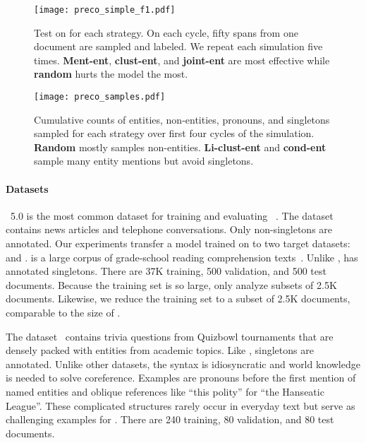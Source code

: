 \begin{figure}[!t]
    \centering
    \texttt{[image: preco\_simple\_f1.pdf]}
    \caption{Test \avgfone{} on \preco{} for each strategy.
    On each
    cycle,
    fifty spans from one document are sampled and labeled.
    We repeat each
    simulation five times.
    \textbf{Ment-ent},
    \textbf{clust-ent}, and \textbf{joint-ent} are most  effective
    while
    \textbf{random} hurts the model the most.
    }
    \label{fig:preco_simple}
\end{figure}

\begin{figure}[!t]
    \centering
    \texttt{[image: preco\_samples.pdf]}
    \caption{Cumulative counts of entities, non-entities, pronouns, and
    singletons
    sampled for each strategy over first four cycles of the \preco{} simulation. \textbf{Random} mostly samples
    non-entities. \textbf{Li-clust-ent} and \textbf{cond-ent} sample many
    entity mentions but avoid singletons.
    }
    \label{fig:preco_samples}
\end{figure}

\paragraph{Datasets}

\ontonotes~{\small 5.0} is the most common dataset for training and evaluating
\coref{}~\citep{pradhan-2013}.
The dataset contains news articles
and telephone conversations. Only non-singletons are annotated.
Our experiments transfer a model trained on \ontonotes{} to two
target datasets: \preco{} and \qbcoref{}.
\preco{} is a large corpus of grade-school reading comprehension
texts~\citep{chen-2018-preco}.
Unlike \ontonotes{}, \preco{} has annotated singletons. There are 37K training, 500 validation, and 500 test
documents.
Because the training set is so large, \citet{chen-2018-preco} only analyze
subsets of 2.5K documents.
Likewise, we reduce the training set to a subset of 2.5K
documents, comparable to the size of \ontonotes{}.

The \qbcoref{} dataset~\citep{guha-2015} contains trivia questions from Quizbowl
tournaments
that are densely packed with
entities from academic topics.
Like \preco{}, singletons are
annotated.
Unlike other datasets, the syntax is idiosyncratic and world knowledge is needed
to solve coreference.
Examples are pronouns before the first mention of named
entities and oblique references like ``this polity'' for
``the Hanseatic League''.
These complicated structures rarely occur in everyday text but serve
as challenging examples for \coref{}.
There are 240 training, 80
validation, and 80 test documents.



